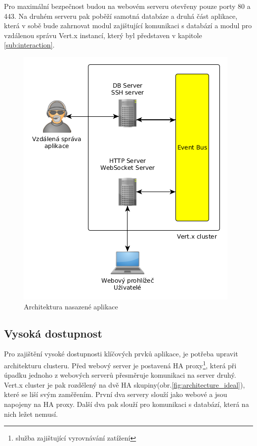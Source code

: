 Pro maximální bezpečnost budou na webovém serveru otevřeny pouze porty 80 a 443. Na druhém serveru pak poběží samotná databáze a druhá část aplikace, která v sobě bude zahrnovat modul zajištující komunikaci s databází a modul pro vzdálenou správu Vert.x instancí, který byl představen v kapitole \ref{sub:interaction}.

\begin{figure}
\begin{centering}
\includegraphics[scale=0.5]{obrazky/architecture_real}
\par\end{centering}
\caption{Architektura nasazené aplikace\label{fig:architecture_real}}
\end{figure}

\subsection{Vysoká dostupnost}

Pro zajištění vysoké dostupnosti klíčových prvků aplikace, je potřeba upravit architekturu clusteru. Před webový server je postavená HA proxy\footnote{služba zajištující vyrovnávání zatížení}, která při úpadku jednoho z webových serverů přesměruje komunikaci na server druhý. Vert.x cluster je pak rozdělený na dvě HA skupiny(obr.\ref{fig:architecture_ideal}), které se liší svým zaměřením. První dva servery slouží jako webové a jsou napojeny na HA proxy. Další dva pak slouží pro komunikaci s databází, která na nich ležet nemusí.

